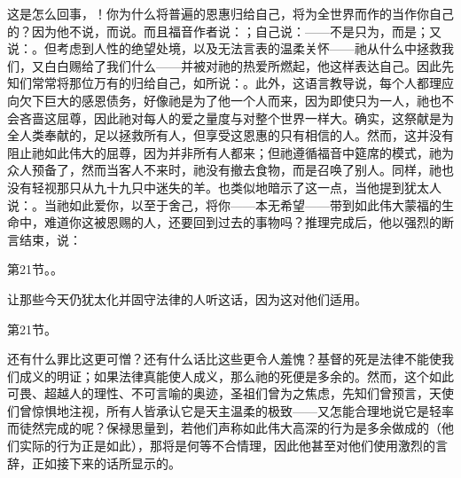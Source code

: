 这是怎么回事，！你为什么将普遍的恩惠归给自己，将为全世界而作的当作你自己的？因为他不说，而说。而且福音作者说：；自己说：——不是只为，而是；又说：。但考虑到人性的绝望处境，以及无法言表的温柔关怀——祂从什么中拯救我们，又白白赐给了我们什么——并被对祂的热爱所燃起，他这样表达自己。因此先知们常常将那位万有的归给自己，如所说：。此外，这语言教导说，每个人都理应向欠下巨大的感恩债务，好像祂是为了他一个人而来，因为即使只为一人，祂也不会吝啬这屈尊，因此祂对每人的爱之量度与对整个世界一样大。确实，这祭献是为全人类奉献的，足以拯救所有人，但享受这恩惠的只有相信的人。然而，这并没有阻止祂如此伟大的屈尊，因为并非所有人都来；但祂遵循福音中筵席的模式，祂为众人预备了，然而当客人不来时，祂没有撤去食物，而是召唤了别人。同样，祂也没有轻视那只从九十九只中迷失的羊。也类似地暗示了这一点，当他提到犹太人说：。当祂如此爱你，以至于舍己，将你——本无希望——带到如此伟大蒙福的生命中，难道你这被恩赐的人，还要回到过去的事物吗？推理完成后，他以强烈的断言结束，说：\par

第21节。。\par

让那些今天仍犹太化并固守法律的人听这话，因为这对他们适用。\par

第21节。\par

还有什么罪比这更可憎？还有什么话比这些更令人羞愧？基督的死是法律不能使我们成义的明证；如果法律真能使人成义，那么祂的死便是多余的。然而，这个如此可畏、超越人的理性、不可言喻的奥迹，圣祖们曾为之焦虑，先知们曾预言，天使们曾惊惧地注视，所有人皆承认它是天主温柔的极致——又怎能合理地说它是轻率而徒然完成的呢？保禄思量到，若他们声称如此伟大高深的行为是多余做成的（他们实际的行为正是如此），那将是何等不合情理，因此他甚至对他们使用激烈的言辞，正如接下来的话所显示的。\par


